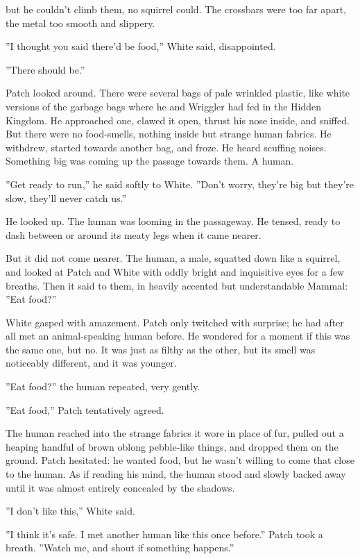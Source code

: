 \documentclass[11pt]{article}
\begin{document}
 but he couldn't climb them, no squirrel could. The crossbars were too far apart, the metal too smooth and slippery.\par
 ''I thought you said there'd be food,'' White said, disappointed.\par
 ''There should be.''\par
 Patch looked around. There were several bags of pale wrinkled plastic, like white versions of the garbage bags where he and Wriggler had fed in the Hidden Kingdom. He approached one, clawed it open, thrust his nose inside, and sniffed. But there were no food-smells, nothing inside but strange human fabrics. He withdrew, started towards another bag, and froze. He heard scuffing noises. Something big was coming up the passage towards them. A human.\par
 ''Get ready to run,'' he said softly to White. ''Don't worry, they're big but they're slow, they'll never catch us.''\par
 He looked up. The human was looming in the passageway. He tensed, ready to dash between or around its meaty legs when it came nearer.\par
 But it did not come nearer. The human, a male, squatted down like a squirrel, and looked at Patch and White with oddly bright and inquisitive eyes for a few breaths. Then it said to them, in heavily accented but understandable Mammal: ''Eat food?''\par
 White gasped with amazement. Patch only twitched with surprise; he had after all met an animal-speaking human before. He wondered for a moment if this was the same one, but no. It was just as filthy as the other, but its smell was noticeably different, and it was younger.\par
 ''Eat food?'' the human repeated, very gently.\par
 ''Eat food,'' Patch tentatively agreed.\par
 The human reached into the strange fabrics it wore in place of fur, pulled out a heaping handful of brown oblong pebble-like things, and dropped them on the ground. Patch hesitated: he wanted food, but he wasn't willing to come that close to the human. As if reading his mind, the human stood and slowly backed away until it was almost entirely concealed by the shadows.\par
 ''I don't like this,'' White said.\par
 ''I think it's safe. I met another human like this once before.'' Patch took a breath. ''Watch me, and shout if something happens.''\par
\end{document}
